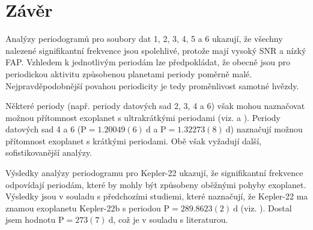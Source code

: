 \documentclass[a4paper,11pt,twocolumn]{article}
\begin{document}
    \newpage
    \section{Závěr}
        Analýzy periodogramů pro soubory dat 1, 2, 3, 4, 5 a 6 ukazují, že všechny nalezené signifikantní frekvence jsou spolehlivé, protože mají vysoký SNR a nízký FAP. Vzhledem k jednotlivým periodám lze předpokládat, že obecně jsou pro periodickou aktivitu způsobenou planetami periody poměrně malé. Nejpravděpodobnější povahou periodicity je tedy proměnlivost samotné hvězdy. 

        Některé periody (např. periody datových sad 2, 3, 4 a 6) však mohou naznačovat možnou přítomnost exoplanet s ultrakrátkými periodami (viz. \citet{frustagli2020} a \citet{wang2024}). Periody datových sad 4 a 6 ($\text{P} = 1.20049(6) ~ \text{d}$ a $\text{P} = 1.32273(8) ~ \text{d}$) naznačují možnou přítomnost exoplanet s krátkými periodami. Obě však vyžadují další, sofistikovanější analýzy. 
        
        Výsledky analýzy periodogramu pro Kepler-22 ukazují, že signifikantní frekvence odpovídají periodám, které by mohly být způsobeny oběžnými pohyby exoplanet. Výsledky jsou v souladu s předchozími studiemi, které naznačují, že Kepler-22 ma znamou exoplanetu Kepler-22b s periodou $\text{P} = 289.8623(2) ~ \text{d}$ (viz. \citet{borucki2012}). Dostal jsem hodnotu $\text{P} = 273(7) ~ \text{d}$, což je v souladu s literaturou.

    
    
\end{document}
